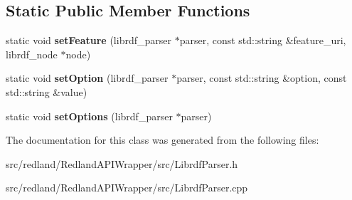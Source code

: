 \subsection*{Static Public Member Functions}
\begin{DoxyCompactItemize}
\item 
\mbox{\label{classredland_1_1LibrdfParser_adcca22d570842637f601c19256f67c2b}} 
static void {\bfseries set\+Feature} (librdf\+\_\+parser $\ast$parser, const std\+::string \&feature\+\_\+uri, librdf\+\_\+node $\ast$node)
\item 
\mbox{\label{classredland_1_1LibrdfParser_aafc4a6e2748ee1175471ed0815d77eff}} 
static void {\bfseries set\+Option} (librdf\+\_\+parser $\ast$parser, const std\+::string \&option, const std\+::string \&value)
\item 
\mbox{\label{classredland_1_1LibrdfParser_a79fcda1e0c2cccfa8a070a1aea196ebd}} 
static void {\bfseries set\+Options} (librdf\+\_\+parser $\ast$parser)
\end{DoxyCompactItemize}


The documentation for this class was generated from the following files\+:\begin{DoxyCompactItemize}
\item 
src/redland/\+Redland\+A\+P\+I\+Wrapper/src/Librdf\+Parser.\+h\item 
src/redland/\+Redland\+A\+P\+I\+Wrapper/src/Librdf\+Parser.\+cpp\end{DoxyCompactItemize}
